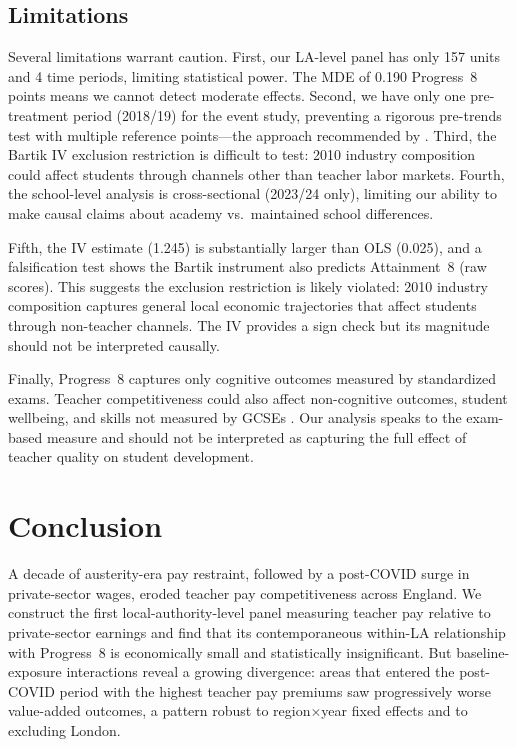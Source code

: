 \documentclass[12pt]{article}
\begin{document}
\subsection{Limitations}

Several limitations warrant caution. First, our LA-level panel has only 157 units and 4 time periods, limiting statistical power. The MDE of 0.190 Progress~8 points means we cannot detect moderate effects. Second, we have only one pre-treatment period (2018/19) for the event study, preventing a rigorous pre-trends test with multiple reference points---the approach recommended by \citet{rambachan2023more}. Third, the Bartik IV exclusion restriction is difficult to test: 2010 industry composition could affect students through channels other than teacher labor markets. Fourth, the school-level analysis is cross-sectional (2023/24 only), limiting our ability to make causal claims about academy vs.\ maintained school differences.

Fifth, the IV estimate (1.245) is substantially larger than OLS (0.025), and a falsification test shows the Bartik instrument also predicts Attainment~8 (raw scores). This suggests the exclusion restriction is likely violated: 2010 industry composition captures general local economic trajectories that affect students through non-teacher channels. The IV provides a sign check but its magnitude should not be interpreted causally.

Finally, Progress~8 captures only cognitive outcomes measured by standardized exams. Teacher competitiveness could also affect non-cognitive outcomes, student wellbeing, and skills not measured by GCSEs \citep{jackson2018does, kraft2019teacher}. Our analysis speaks to the exam-based measure and should not be interpreted as capturing the full effect of teacher quality on student development.


\section{Conclusion}

A decade of austerity-era pay restraint, followed by a post-COVID surge in private-sector wages, eroded teacher pay competitiveness across England. We construct the first local-authority-level panel measuring teacher pay relative to private-sector earnings and find that its contemporaneous within-LA relationship with Progress~8 is economically small and statistically insignificant. But baseline-exposure interactions reveal a growing divergence: areas that entered the post-COVID period with the highest teacher pay premiums saw progressively worse value-added outcomes, a pattern robust to region$\times$year fixed effects and to excluding London.
\end{document}
